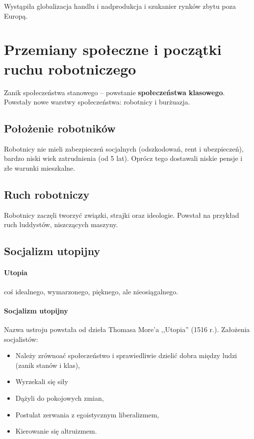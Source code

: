 \documentclass [a4paper, 11pt, oneside]{book}
\begin{document}
        Wystąpiła globalizacja handlu i nadprodukcja i szukanier rynków zbytu poza Europą.

    \section{Przemiany społeczne i początki ruchu robotniczego} %
    \label{sec:przemiany_spo_eczne_i_pocz_tki_ruchu_robotniczego}
        Zanik społeczeństwa stanowego -- powstanie \textbf{społeczeństwa klasowego}. Powstały nowe warstwy społeczeństwa: robotnicy i burżuazja.

        \subsection{Położenie robotników} %
        \label{sub:po_o_enie_robotnik_w}
            Robotnicy nie mieli zabezpieczeń socjalnych (odszkodowań, rent i ubezpieczeń), bardzo niski wiek zatrudnienia (od 5 lat). Oprócz tego dostawali niskie pensje i złe warunki mieszkalne.
        
        \subsection{Ruch robotniczy} %
        \label{sub:ruch_robotniczy}
            Robotnicy zaczęli tworzyć związki, strajki oraz ideologie. Powstał na przykład ruch luddystów, niszczących maszyny.

        \subsection{Socjalizm utopijny} %
        \label{sub:socjalizm_utopijny}
            \paragraph{Utopia} coś idealnego, wymarzonego, pięknego, ale nieosiągalnego.
            \paragraph{Socjalizm utopijny}
            Nazwa ustroju powstała od dzieła Thomasa More'a ,,Utopia'' (1516 r.). Założenia socjalistów:
                \begin{itemize}
                    \item Należy zrównoać społeczeństwo i sprawiedliwie dzielić dobra między ludzi (zanik stanów i klas),
                    \item Wyrzekali się siły
                    \item Dążyli do pokojowych zmian,
                    \item Postulat zerwania z egoistycznym liberalizmem,
                    \item Kierowanie się altruizmem.
                \end{itemize}
\end{document}
